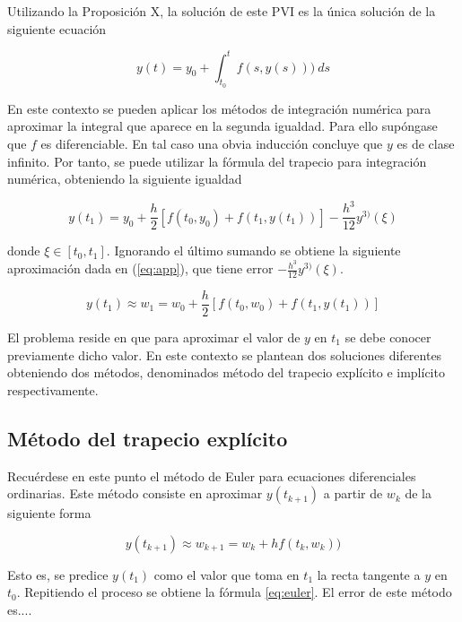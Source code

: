 \documentclass{article}
\theoremstyle{theorem-style}  %
\theoremstyle{definition}
\theoremstyle{example-style}
\begin{document}
	Utilizando la Proposición X, la solución de este PVI es la única solución de la siguiente ecuación
	
	\begin{equation}
		y(t)  = y_0 + \int_{t_0}^{t} f(s,y(s))) \ ds
	\end{equation}
	
	En este contexto se pueden aplicar los métodos de integración numérica para aproximar la integral que aparece en la segunda igualdad. Para ello supóngase que $f$ es diferenciable. En tal caso una obvia inducción concluye que $y$ es de clase infinito. Por tanto, se puede utilizar la fórmula del trapecio para integración numérica, obteniendo la siguiente igualdad
	
	\begin{equation}
		y(t_{1}) = y_0 + \frac{h}{2} \left[f(t_0,y_0) + f(t_1, y(t_1))\right] - \frac{h^3}{12}y^{3)}(\xi)
	\end{equation}


	donde $\xi \in [t_0, t_1]$. Ignorando el último sumando se obtiene la siguiente aproximación dada en (\ref{eq:app}), que tiene error $- \frac{h^3}{12}y^{3)}(\xi)$.

	\begin{equation} \label{eq:app}
		y(t_1) \approx w_1 = w_0 + \frac{h}{2} \left[f(t_0,w_0) + f(t_1, y(t_1))\right]
	\end{equation}

	El problema reside en que para aproximar el valor de $y$ en $t_1$ se debe conocer previamente dicho valor. En este contexto se plantean dos soluciones diferentes obteniendo dos métodos, denominados método del trapecio explícito e implícito respectivamente.
	
	\subsection{Método del trapecio explícito}
		
		Recuérdese en este punto el método de Euler para ecuaciones diferenciales ordinarias. Este método consiste en aproximar $y(t_{k+1})$ a partir de $w_k$ de la siguiente forma
		
		\begin{equation} \label{eq:euler}
			y(t_{k+1}) \approx w_{k+1} = w_k + h f(t_k,w_k))
		\end{equation}

		Esto es, se predice $y(t_{1})$ como el valor que toma en $t_1$ la recta tangente a $y$ en $t_0$. Repitiendo el proceso se obtiene la fórmula \ref{eq:euler}. El error de este método es....
\end{document}
